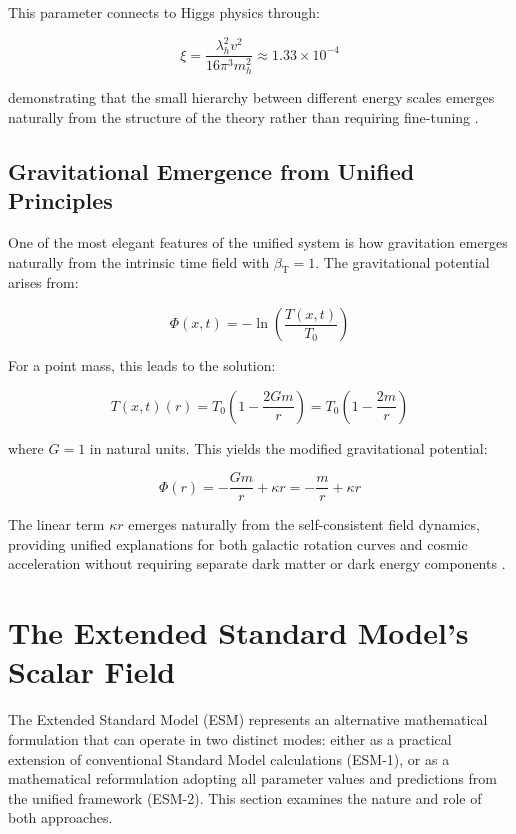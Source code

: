 \documentclass[12pt,a4paper]{article}
\newcommand{\Tfieldt}{T(x,t)}
\newcommand{\betaT}{\beta_{\text{T}}}
\newcommand{\Tzero}{T_0}
\newcommand{\xipar}{\xi}
\begin{document}
	This parameter connects to Higgs physics through:
	
	\begin{equation}
		\xipar = \frac{\lambda_h^2 v^2}{16\pi^3 m_h^2} \approx 1.33 \times 10^{-4}
	\end{equation}
	
	demonstrating that the small hierarchy between different energy scales emerges naturally from the structure of the theory rather than requiring fine-tuning \cite{pascher_beta_derivation_2025}.
	
	\subsection{Gravitational Emergence from Unified Principles}
	\label{subsec:gravitational_emergence_unified}
	
	One of the most elegant features of the unified system is how gravitation emerges naturally from the intrinsic time field with $\betaT = 1$. The gravitational potential arises from:
	
	\begin{equation}
		\Phi(x,t) = -\ln\left(\frac{\Tfieldt}{\Tzero}\right)
	\end{equation}
	
	For a point mass, this leads to the solution:
	
	\begin{equation}
		\Tfieldt(r) = \Tzero\left(1 - \frac{2Gm}{r}\right) = \Tzero\left(1 - \frac{2m}{r}\right)
	\end{equation}
	
	where $G = 1$ in natural units. This yields the modified gravitational potential:
	
	\begin{equation}
		\Phi(r) = -\frac{Gm}{r} + \kappa r = -\frac{m}{r} + \kappa r
	\end{equation}
	
	The linear term $\kappa r$ emerges naturally from the self-consistent field dynamics, providing unified explanations for both galactic rotation curves and cosmic acceleration without requiring separate dark matter or dark energy components \cite{McGaugh2016}.
	
	\section{The Extended Standard Model's Scalar Field}
	\label{sec:esm_scalar_field}
	
	The Extended Standard Model (ESM) represents an alternative mathematical formulation that can operate in two distinct modes: either as a practical extension of conventional Standard Model calculations (ESM-1), or as a mathematical reformulation adopting all parameter values and predictions from the unified framework (ESM-2). This section examines the nature and role of both approaches.
	
\end{document}
